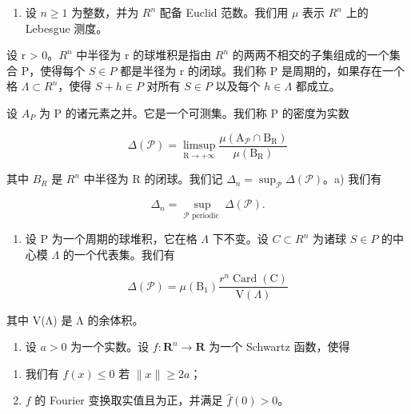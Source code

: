 \begin{enumerate}
\def\labelenumi{\arabic{enumi})}
\setcounter{enumi}{58}
\tightlist
\item
  设 \(n \geqslant 1\) 为整数，并为 \(R^{n}\) 配备 Euclid 范数。我们用 \(\mu\) 表示 \(R^{n}\) 上的 Lebesgue 测度。
\end{enumerate}

设 r \textgreater{} 0。\(R^{n}\) 中半径为 r 的球堆积是指由 \(R^{n}\) 的两两不相交的子集组成的一个集合 P，使得每个 \(S \in P\) 都是半径为 r 的闭球。我们称 P 是周期的，如果存在一个格 \(\Lambda \subset R^{n}\)，使得 \(S + h \in P\) 对所有 \(S \in P\) 以及每个 \(h \in \Lambda\) 都成立。

设 \(A _{P}\) 为 P 的诸元素之并。它是一个可测集。我们称 P 的密度为实数

\[
\Delta (\mathcal {P}) = \limsup _ {\mathrm{R} \to + \infty} \frac {\mu (\mathrm{A} _ {\mathcal {P}} \cap \mathrm{B} _ {\mathrm{R}})}{\mu (\mathrm{B} _ {\mathrm{R}})}
\]

其中 \(B_{R}\) 是 \(R^{n}\) 中半径为 R 的闭球。我们记 \(\Delta_{n} = \sup_{\mathcal{P}} \Delta(\mathcal{P})\)。a) 我们有

\[
\Delta_ {n} = \sup _ {\mathcal {P} \text {   periodic }} \Delta (\mathcal {P}).
\]

\begin{enumerate}
\def\labelenumi{\alph{enumi})}
\setcounter{enumi}{1}
\tightlist
\item
  设 P 为一个周期的球堆积，它在格 \(\Lambda\) 下不变。设 \(C \subset R^{n}\) 为诸球 \(S \in P\) 的中心模 \(\Lambda\) 的一个代表集。我们有
\end{enumerate}

\[
\Delta (\mathcal {P}) = \mu (\mathrm{B} _ {1}) \frac {r ^ {n} \operatorname{Card} (\mathrm{C})}{\mathrm{V} (\Lambda)}
\]

其中 V(Λ) 是 Λ 的余体积。

\begin{enumerate}
\def\labelenumi{\alph{enumi})}
\setcounter{enumi}{2}
\tightlist
\item
  设 \(a > 0\) 为一个实数。设 \(f: \mathbf{R}^{n} \to \mathbf{R}\) 为一个 Schwartz 函数，使得
\end{enumerate}

\begin{enumerate}
\def\labelenumi{(\roman{enumi})}
\item
  我们有 \(f(x) \leqslant 0 \text{ 若 } \|x\| \geqslant 2a\)；
\item
  \(f\) 的 Fourier 变换取实值且为正，并满足 \(\widehat{f}(0)>0\)。
\end{enumerate}

